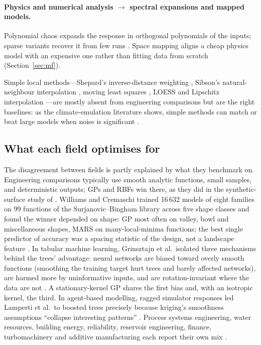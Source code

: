 \paragraph{Physics and numerical analysis $\rightarrow$ spectral expansions and mapped models.}
Polynomial chaos \cite{ghanem1991stochastic,xiu2002wiener} expands the response in orthogonal polynomials of the
inputs; sparse variants recover it from few runs \cite{luthen2021sparse}. Space mapping
\cite{bandler1994space,koziel2008space} aligns a cheap physics model with an expensive one rather than fitting data from
scratch (Section~\ref{sec:mf}).

Simple local methods---Shepard's inverse-distance weighting \cite{shepard1968two}, Sibson's natural-neighbour
interpolation \cite{sibson1981brief}, moving least squares \cite{lancaster1981surfaces}, LOESS
\cite{cleveland1979robust} and Lipschitz interpolation \cite{beliakov2006interpolation}---are mostly absent from
engineering comparisons but are the right baselines: as the climate-emulation literature shows, simple methods can
match or beat large models when noise is significant \cite{lutjens2024climatebench}.

\subsection{What each field optimises for}
The disagreement between fields is partly explained by what they benchmark on. Engineering comparisons
\cite{jin2001comparative,simpson2001metamodels,wang2007review,viana2014metamodeling,alizadeh2020managing,kudela2022recent,yondo2018review}
typically use smooth analytic functions, small samples, and deterministic outputs; GPs and RBFs win there, as they did in
the synthetic-surface study of \cite[App.~G]{poznanski2026towards}. Williams and Cremaschi trained 16\,632 models of eight families on 99 functions of the Surjanovic--Bingham
library across five shape classes and found the winner depended on shape: GP most often on valley, bowl and
miscellaneous shapes, MARS on many-local-minima functions; the best single predictor of accuracy was a spacing
statistic of the design, not a landscape feature \cite{williams2021novel,williams2021selection}. In tabular machine
learning, Grinsztajn et al.\ isolated three mechanisms behind the trees' advantage: neural networks are biased toward
overly smooth functions (smoothing the training target hurt trees and barely affected networks), are harmed more by
uninformative inputs, and are rotation-invariant where the data are not
\cite{grinsztajn2022tree,rahaman2019spectral,ng2004feature}. A stationary-kernel GP shares the first bias and, with an
isotropic kernel, the third. In agent-based modelling, ragged simulator responses led Lamperti et al.\ to boosted trees
precisely because kriging's smoothness assumptions ``collapse interesting patterns'' \cite{lamperti2018agent}. Process
systems engineering, water resources, building energy, reliability, reservoir engineering, finance, turbomachinery and
additive manufacturing each report their own mix
\cite{bhosekar2018advances,mcbride2019overview,razavi2012review,asher2015review,westermann2019surrogate,moustapha2022active,bahrami2022proxy,ludkovski2023statistical,ruf2020neural,li2017review,hu2017uncertainty}.

